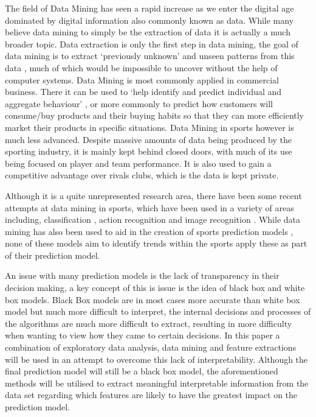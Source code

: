 \documentclass{imc-inf}
\begin{document}
	The field of Data Mining has seen a rapid increase as we enter the digital age dominated by digital information also commonly known as data. While many believe data mining to simply be the extraction of data it is actually a much broader topic. Data extraction is only the first step in data mining, the goal of data mining is to extract ‘previously unknown’ and unseen patterns from this data \cite{website:TechGuy}, much of which would be impossible to uncover without the help of computer systems. Data Mining is most commonly applied in commercial business. There it can be used to ‘help identify and predict individual and aggregate behaviour’ \cite{ACM}, or more commonly to predict how customers will consume/buy products and their buying habits so that they can more efficiently market their products in specific situations. Data Mining in sports however is much less advanced. Despite massive amounts of data being produced by the sporting industry, it is mainly kept behind closed doors, with much of its use being focused on player and team performance. It is also used to gain a competitive advantage over rivals clubs, which is the data is kept private.
	\newline
		
	Although it is a quite unrepresented research area, there have been some recent attempts at data mining in sports, which have been used in a variety of areas including, classification \cite{Displays}, action recognition \cite{AEJ} and image recognition \cite{Heliyon}. While data mining has also been used to aid in the creation of sports prediction models \cite{CollegeFootball}\cite{Basketball}\cite{LSTMPrediction}, none of these models aim to identify trends within the sports apply these as part of their prediction model. 
	
	An issue with many prediction models is the lack of transparency in their decision making, a key concept of this is issue is the idea of black box and white box models. Black Box models are in most cases more accurate than white box model but much more difficult to interpret, the internal decisions and processes of the algorithms are much more difficult to extract, resulting in more difficulty when wanting to view how they came to certain decisions. In this paper a combination of exploratory data analysis, data mining and feature extractions will be used in an attempt to overcome this lack of interpretability. Although the final prediction model will still be a black box model, the aforementioned methods will be utilised to extract meaningful interpretable information from the data set regarding which features are likely to have the greatest impact on the prediction model.
	\newline
	
\end{document}
